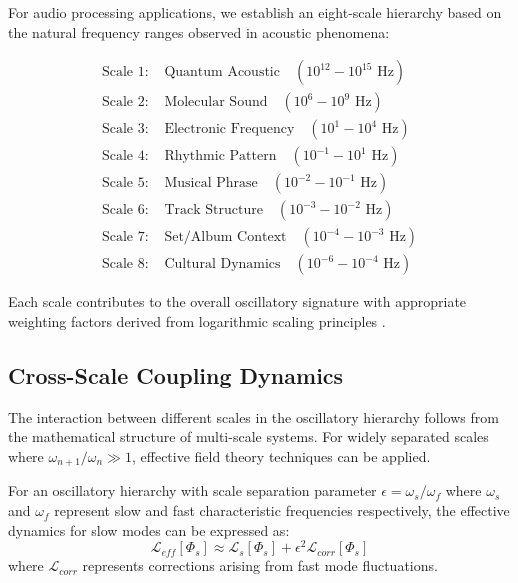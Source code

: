 For audio processing applications, we establish an eight-scale hierarchy based on the natural frequency ranges observed in acoustic phenomena:

\begin{align}
\text{Scale 1: } &\text{Quantum Acoustic} \quad (10^{12}-10^{15} \text{ Hz}) \label{eq:scale1} \\
\text{Scale 2: } &\text{Molecular Sound} \quad (10^6-10^9 \text{ Hz}) \label{eq:scale2} \\
\text{Scale 3: } &\text{Electronic Frequency} \quad (10^1-10^4 \text{ Hz}) \label{eq:scale3} \\
\text{Scale 4: } &\text{Rhythmic Pattern} \quad (10^{-1}-10^1 \text{ Hz}) \label{eq:scale4} \\
\text{Scale 5: } &\text{Musical Phrase} \quad (10^{-2}-10^{-1} \text{ Hz}) \label{eq:scale5} \\
\text{Scale 6: } &\text{Track Structure} \quad (10^{-3}-10^{-2} \text{ Hz}) \label{eq:scale6} \\
\text{Scale 7: } &\text{Set/Album Context} \quad (10^{-4}-10^{-3} \text{ Hz}) \label{eq:scale7} \\
\text{Scale 8: } &\text{Cultural Dynamics} \quad (10^{-6}-10^{-4} \text{ Hz}) \label{eq:scale8}
\end{align}

Each scale contributes to the overall oscillatory signature with appropriate weighting factors derived from logarithmic scaling principles \cite{stevens1957}.


\subsection{Cross-Scale Coupling Dynamics}

The interaction between different scales in the oscillatory hierarchy follows from the mathematical structure of multi-scale systems. For widely separated scales where $\omega_{n+1}/\omega_n \gg 1$, effective field theory techniques can be applied.

\begin{theorem}
For an oscillatory hierarchy with scale separation parameter $\epsilon = \omega_s/\omega_f$ where $\omega_s$ and $\omega_f$ represent slow and fast characteristic frequencies respectively, the effective dynamics for slow modes can be expressed as:
\begin{equation}
\mathcal{L}_{eff}[\Phi_s] \approx \mathcal{L}_s[\Phi_s] + \epsilon^2 \mathcal{L}_{corr}[\Phi_s]
\end{equation}
where $\mathcal{L}_{corr}$ represents corrections arising from fast mode fluctuations.
\end{theorem}

